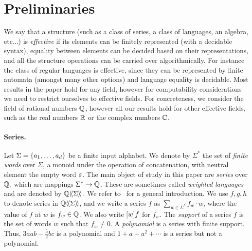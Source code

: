 \section{Preliminaries}
\label{sec:preliminaries}

%
%
We say that a structure (such as a class of series, a class of languages, an algebra, etc...)
is \emph{effective} if its elements can be finitely represented (with a decidable syntax),
equality between elements can be decided based on their representations,
and all the structure operations can be carried over algorithmically.
%
For instance the class of regular languages is effective,
since they can be represented by finite automata (amongst many other options)
and language equality is decidable.
%
Most results in the paper hold for any field,
however for computability considerations we need to restrict ourselves to effective fields.
%
For concreteness, we consider the field of rational numbers $\mathbb Q$,
however all our results hold for other effective fields,
such as the real numbers $\mathbb R$ or the complex numbers $\mathbb C$.

\paragraph{Series.}

Let $\Sigma = \left\{a_1, \dots, a_d\right\}$ be a finite input alphabet.
We denote by $\Sigma^*$ the set of \emph{finite words} over $\Sigma$,
a monoid under the operation of concatenation,
with neutral element the empty word $\varepsilon$.
The main object of study in this paper are \emph{series} over $\mathbb Q$,
which are mappings $\Sigma^* \to \mathbb Q$.
%
These are sometimes called \emph{weighted languages}
and are denoted by $\mathbb Q\langle\!\langle\Sigma\rangle\!\rangle$.
%
We refer to~\cite{BerstelReutenauer:CUP:2010} for a general introduction.
%
We use $f, g, h$ to denote series in $\mathbb Q\langle\!\langle\Sigma\rangle\!\rangle$,
and we write a series $f$ as $\sum_{w \in \Sigma^*} f_w \cdot w$,
where the value of $f$ at $w$ is $f_w \in \mathbb Q$.
%
We also write $[w]f$ for $f_w$.
%
The \emph{support} of a series $f$
is the set of words $w$ such that $f_w \neq 0$.
%
A \emph{polynomial} is a series with finite support. 
%
Thus, $3aab - \frac 5 2 bc$ is a polynomial
and $1+a+a^2 + \cdots$ is a series but not a polynomial.

